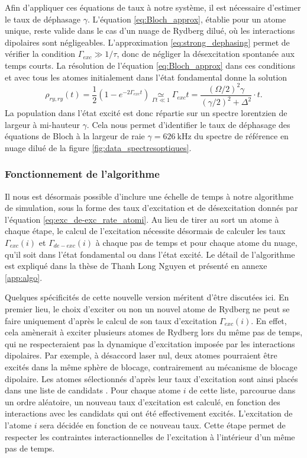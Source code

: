 Afin d'appliquer ces équations de taux à notre système, il est nécessaire d'estimer le taux de déphasage $\gamma$.
L'équation \eqref{eq:Bloch_approx}, établie pour un atome unique, reste valide dans le cas d'un nuage de Rydberg dilué, où les interactions dipolaires sont négligeables.
L'approximation \eqref{eq:strong_dephasing} permet de vérifier la condition $\Gamma_{exc} \gg 1/\tau$, donc de négliger la désexcitation spontanée aux temps courts.
La résolution de l'équation \eqref{eq:Bloch_approx} dans ces conditions et avec tous les atomes initialement dans l'état fondamental donne la solution 
\begin{equation}
\label{eq:Lorenztian_rhorr}
\rho_{ry,ry} (t) = \frac{1}{2}\left( 1-e^{-2\Gamma_{exc}t} \right)
\underset{\Gamma t \ll 1}{\simeq} \Gamma_{exc} t = \frac{(\Omega/2)^2 \gamma}{(\gamma/2)^2 + \Delta^2} \cdot t.
\end{equation}
La population dans l'état excité est donc répartie sur un spectre lorentzien de largeur à mi-hauteur $\gamma$.
Cela nous permet d'identifier le taux de déphasage des équations de Bloch à la largeur de raie $\gamma = \SI{626}{\kHz}$ du spectre de référence en nuage dilué de la figure \eqref{fig:data_spectresoptiques}.

	\subsubsection*{Fonctionnement de l'algorithme}
\noindent Il nous est désormais possible d'inclure une échelle de temps à notre algorithme de simulation, sous la forme des taux d'excitation et de désexcitation donnés par l'équation \eqref{eq:exc_de-exc_rate_atomi}.
Au lieu de tirer au sort un atome à chaque étape, le calcul de l'excitation nécessite désormais de calculer les taux $\Gamma_{exc}(i)$ et $\Gamma_{de-exc}(i)$ à chaque pas de temps et pour chaque atome du nuage, qu'il soit dans l'état fondamental ou dans l'état excité.
Le détail de l'algorithme est expliqué dans la thèse de Thanh Long Nguyen \cite{PHD_NGUYEN} et présenté en annexe \ref{app:algo}.

Quelques spécificités de cette nouvelle version méritent d'être discutées ici.
En premier lieu, le choix d'exciter ou non un nouvel atome de Rydberg ne peut se faire uniquement d'après le calcul de son taux d'excitation $\Gamma_{exc}(i)$.
En effet, cela amènerait à exciter plusieurs atomes de Rydberg lors du même pas de temps, qui ne respecteraient pas la dynamique d'excitation imposée par les interactions dipolaires.
Par exemple, à désaccord laser nul, deux atomes pourraient être excités dans la même sphère de blocage, contrairement au mécanisme de blocage dipolaire.
Les atomes sélectionnés d'après leur taux d'excitation sont ainsi placés dans une liste de \og candidats \fg{}.
Pour chaque atome $i$ de cette liste, parcourue dans un ordre aléatoire, un nouveau taux d'excitation est calculé, en fonction des interactions avec les candidats qui ont été effectivement excités.
L'excitation de l'atome $i$ sera décidée en fonction de ce nouveau taux.
Cette étape permet de respecter les contraintes interactionnelles de l'excitation à l'intérieur d'un même pas de temps.

